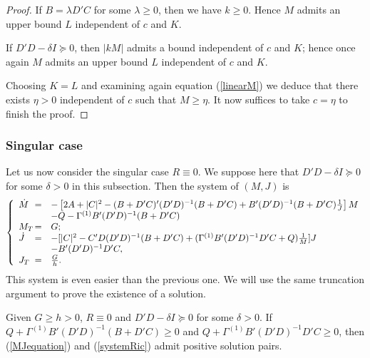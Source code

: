\documentclass[final]{siamltex}
\begin{document}
\begin{proof}
If $B=\lambda D'C$ for some $\lambda\ge 0$, then we have $k\ge 0$. Hence $M$ admits an upper bound $L$  independent of $c$ and $K$.

If $D'D- \delta I\succeq 0$,
then $|kM|$ admits a bound independent of $c$ and $K$; hence once again $M$ admits an upper bound $L$ independent of $c$ and $K$.

Choosing $K=L$ and examining again equation (\ref{linearM}) we deduce that there exists $\eta>0$
independent of $c$ such that $M\ge \eta$. It now suffices to take $c=\eta$ to finish the proof.
\end{proof}

\subsubsection{Singular case}
Let us now consider the singular case $R\equiv0$. We suppose here that $D'D-\delta I\succeq 0$ for some $\delta>0$ in this
subsection. Then the system of $(M, J)$ is
 \begin{equation}\label{MJequation}
\left\{\begin{array}{lll}
\dot{M}\hspace{-0.3cm}&=&- \left[2A+|C|^2 -(B+D'C)'(D'D)^{-1}(B+D'C) +B'(D'D)^{-1}(B+D'C)\frac{1}{J}\right] M\\
&&-Q-\Gamma^{(1)} B'(D'D)^{-1}(B+D'C)\\
M_T\hspace{-0.3cm}&=&G;\\
\dot{J}\hspace{-0.3cm}&=&-[|C|^2- C'D(D'D)^{-1}(B+D'C)+ (\Gamma^{(1)} B'(D'D)^{-1}D'C+Q)\frac{1}{M}] J \\
   &&-B'(D'D)^{-1}D'C,\\
 J_T\hspace{-0.3cm}&=&\frac{G}{h}.
\end{array}\right.
\end{equation}
This system is even easier than the previous one.
We will use the same truncation argument  to prove the existence of a solution.

\begin{theorem}
  Given $G\ge h>0$, $R\equiv 0$ and $D'D-\delta I\succeq 0$ for some $\delta>0$.
  If $Q+\Gamma^{(1)} B'(D'D)^{-1}(B+D'C)\ge 0$ and $Q+\Gamma^{(1)} B'(D'D)^{-1}D'C\ge 0$, then  (\ref{MJequation}) and (\ref{systemRic}) admit positive
  solution pairs.
\end{theorem}
\end{document}
